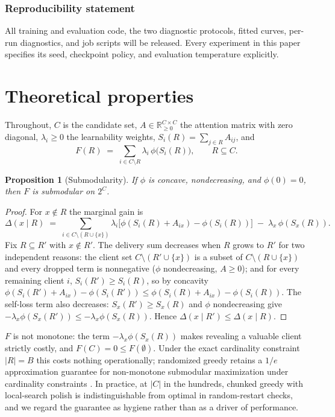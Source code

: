 \documentclass{article} %
\newtheorem{proposition}{Proposition}
\begin{document}
\subsubsection*{Reproducibility statement}
All training and evaluation code, the two diagnostic protocols, fitted curves, per-run diagnostics, and job scripts will be released. Every experiment in this paper specifies its seed, checkpoint policy, and evaluation temperature explicitly.




\appendix

\section{Theoretical properties}
\label{app:theory}

Throughout, $C$ is the candidate set, $A \in \mathbb{R}_{\geq 0}^{C \times C}$ the attention matrix with zero diagonal, $\lambda_i \geq 0$ the learnability weights, $S_i(R) = \sum_{j \in R} A_{ij}$, and
\[
F(R) \;=\; \sum_{i \in C \setminus R} \lambda_i\, \phi\big(S_i(R)\big), \qquad R \subseteq C .
\]

\begin{proposition}[Submodularity]
\label{prop:submodular}
If $\phi$ is concave, nondecreasing, and $\phi(0) = 0$, then $F$ is submodular on $2^C$.
\end{proposition}

\begin{proof}
For $x \notin R$ the marginal gain is
\[
\Delta(x \mid R) \;=\; \sum_{i \in C \setminus (R \cup \{x\})} \lambda_i \big[\phi(S_i(R) + A_{ix}) - \phi(S_i(R))\big] \;-\; \lambda_x\, \phi(S_x(R)).
\]
Fix $R \subseteq R'$ with $x \notin R'$. The delivery sum decreases when $R$ grows to $R'$ for two independent reasons: the client set $C \setminus (R' \cup \{x\})$ is a subset of $C \setminus (R \cup \{x\})$ and every dropped term is nonnegative ($\phi$ nondecreasing, $A \geq 0$); and for every remaining client $i$, $S_i(R') \geq S_i(R)$, so by concavity $\phi(S_i(R') + A_{ix}) - \phi(S_i(R')) \leq \phi(S_i(R) + A_{ix}) - \phi(S_i(R))$. The self-loss term also decreases: $S_x(R') \geq S_x(R)$ and $\phi$ nondecreasing give $-\lambda_x \phi(S_x(R')) \leq -\lambda_x \phi(S_x(R))$. Hence $\Delta(x \mid R') \leq \Delta(x \mid R)$.
\end{proof}

$F$ is not monotone: the term $-\lambda_x \phi(S_x(R))$ makes revealing a valuable client strictly costly, and $F(C) = 0 \leq F(\emptyset)$. Under the exact cardinality constraint $|R| = B$ this costs nothing operationally; randomized greedy retains a $1/e$ approximation guarantee for non-monotone submodular maximization under cardinality constraints \citep{buchbinder2014submodular}. In practice, at $|C|$ in the hundreds, chunked greedy with local-search polish is indistinguishable from optimal in random-restart checks, and we regard the guarantee as hygiene rather than as a driver of performance.
\end{document}
